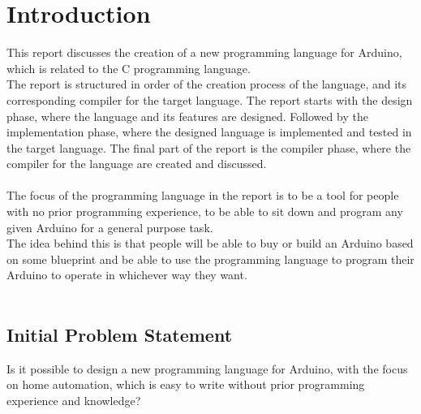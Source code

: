 \chapter{Introduction}\label{ch:introduction}
This report discusses the creation of a new programming language for Arduino, which is related to the C programming language.\\
The report is structured in order of the creation process of the language, and its corresponding compiler for the target language. The report starts with the design phase, where the language and its features are designed. Followed by the implementation phase, where the designed language is implemented and tested in the target language. The final part of the report is the compiler phase, where the compiler for the language are created and discussed.
\\\\
The focus of the programming language in the report is to be a tool for people with no prior programming experience, to be able to sit down and program any given Arduino for a general purpose task.\\
The idea behind this is that people will be able to buy or build an Arduino based on some blueprint and be able to use the programming language to program their Arduino to operate in whichever way they want.
\\\\
\section{Initial Problem Statement}\label{ch:InitialProblemStatement}
Is it possible to design a new programming language for Arduino, with the focus on home automation, which is easy to write without prior programming experience and knowledge?


